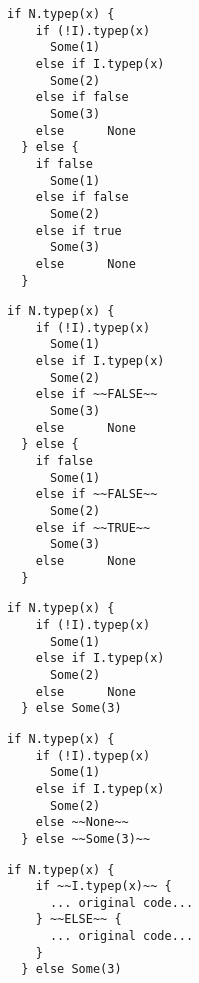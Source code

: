 \newsavebox\typecaseEbox
\begin{lrbox}{\typecaseEbox}
  \begin{minipage}{8cm}
\begin{lstlisting}[style=scalaioScala]
  if N.typep(x) {
    if (!I).typep(x)
      Some(1)
    else if I.typep(x)
      Some(2)
    else if false
      Some(3)
    else      None
  } else {
    if false
      Some(1)
    else if false
      Some(2)
    else if true
      Some(3)
    else      None
  }
\end{lstlisting}
  \end{minipage}
\end{lrbox}

\newsavebox\typecaseEhbox
\begin{lrbox}{\typecaseEhbox}
  \begin{minipage}{8cm}
\begin{lstlisting}[style=scalaioScala]
  if N.typep(x) {
    if (!I).typep(x)
      Some(1)
    else if I.typep(x)
      Some(2)
    else if ~~FALSE~~
      Some(3)
    else      None
  } else {
    if false
      Some(1)
    else if ~~FALSE~~
      Some(2)
    else if ~~TRUE~~
      Some(3)
    else      None
  }
\end{lstlisting}
  \end{minipage}
\end{lrbox}

\newsavebox\typecaseFbox
\begin{lrbox}{\typecaseFbox}
  \begin{minipage}{8cm}
\begin{lstlisting}[style=scalaioScala]
  if N.typep(x) {
    if (!I).typep(x)
      Some(1)
    else if I.typep(x)
      Some(2)
    else      None
  } else Some(3)
\end{lstlisting}
  \end{minipage}
\end{lrbox}

\newsavebox\typecaseFhbox
\begin{lrbox}{\typecaseFhbox}
  \begin{minipage}{8cm}
\begin{lstlisting}[style=scalaioScala]
  if N.typep(x) {
    if (!I).typep(x)
      Some(1)
    else if I.typep(x)
      Some(2)
    else ~~None~~
  } else ~~Some(3)~~
\end{lstlisting}
  \end{minipage}
\end{lrbox}

\newsavebox\typecaseGabox
\begin{lrbox}{\typecaseGabox}
  \begin{minipage}{8cm}
\begin{lstlisting}[style=scalaioScala]
  if N.typep(x) {
    if ~~I.typep(x)~~ {
      ... original code...
    } ~~ELSE~~ {
      ... original code...
    }
  } else Some(3)
\end{lstlisting}
  \end{minipage}
\end{lrbox}

